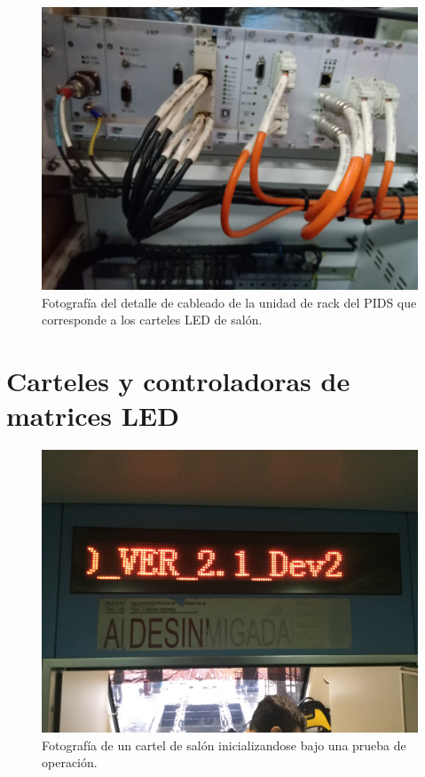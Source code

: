 \begin{figure}[ht]
	\centering
	\includegraphics[width=1\textwidth ]{./Figures/rackPIDS2.jpg}
	\caption{Fotografía del detalle de cableado de la unidad de rack del PIDS que corresponde a los carteles LED de salón.}
	\label{fig:rackPIDS2}
\end{figure}


\pagebreak
\section{Carteles y controladoras de matrices LED}

\begin{figure}[ht]
	\centering
	\includegraphics[width=1\textwidth]{./Figures/cartelIniciando.JPG}
	\caption{Fotografía de un cartel de salón inicializandose bajo una prueba de operación.}
	\label{fig:cartelIniciando}
\end{figure}

